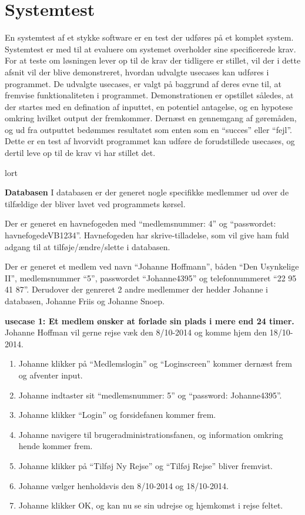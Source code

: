 \section{Systemtest}
En systemtest af et stykke software er en test der udføres på et komplet system. Systemtest er med til at evaluere om systemet overholder sine specificerede krav. For at teste om løsningen lever op til de krav der tidligere er stillet, vil der i dette afsnit vil der blive demonstreret, hvordan udvalgte usecases kan udføres i programmet. De udvalgte usecases, er valgt på baggrund af deres evne til, at fremvise funktionaliteten i programmet. Demonstrationen er opstillet således, at der startes med en defination af inputtet, en potentiel antagelse, og en hypotese omkring hvilket output der fremkommer. Dernæst en gennemgang af gøremåden, og ud fra outputtet bedømmes resultatet som enten som en \enquote{succes} eller \enquote{fejl}. Dette er en test af hvorvidt programmet kan udføre de forudstillede usecases, og dertil leve op til de krav vi har stillet det.


lort

\textbf{Databasen}
I databasen er der generet nogle specifikke medlemmer ud over de tilfældige der bliver lavet ved programmets kørsel.

Der er generet en havnefogeden med \enquote{medlemsnummer: 4} og \enquote{passwordet: havnefogedeVB1234}. Havnefogeden har skrive-tilladelse, som vil give ham fuld adgang til at tilføje/ændre/slette i databasen. 

Der er generet et medlem ved navn \enquote{Johanne Hoffmann}, båden \enquote{Den Usynkelige II}, medlemsnummer \enquote{5},  passwordet \enquote{Johanne4395} og telefonnummeret \enquote{22 95 41 87}. Derudover der genreret 2 andre medlemmer der hedder Johanne i databasen, Johanne Friis og Johanne Snoep. 

\textbf{usecase 1: Et medlem ønsker at forlade sin plads i mere end 24 timer.}
Johanne Hoffman vil gerne rejse væk den 8/10-2014 og komme hjem den 18/10-2014.
\begin{enumerate}
	\item Johanne klikker på \enquote{Medlemslogin} og \enquote{Loginscreen} kommer dernæst frem og afventer input.
	\item Johanne indtaster sit \enquote{medlemsnummer: 5} og \enquote{password: Johanne4395}.
	\item Johanne klikker \enquote{Login} og forsidefanen kommer frem.
	\item Johanne navigere til brugeradministrationsfanen, og information omkring hende kommer frem.
	\item Johanne klikker på \enquote{Tilføj Ny Rejse} og \enquote{Tilføj Rejse} bliver fremvist.
	\item Johanne vælger henholdsvis den 8/10-2014 og 18/10-2014.
	\item Johanne klikker OK, og kan nu se sin udrejse og hjemkomst i rejse feltet.
\end{enumerate}

